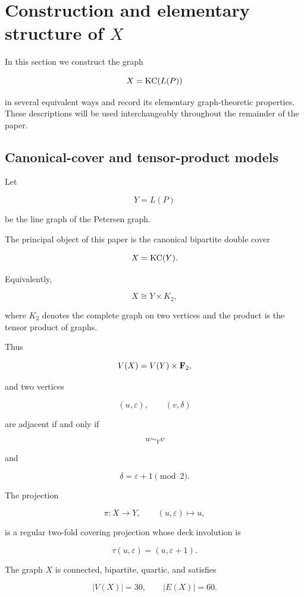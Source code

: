 \section{Construction and elementary structure of \(X\)}

In this section we construct the graph

\[
X=\operatorname{KC}(L(P))
\]

in several equivalent ways and record its elementary graph-theoretic
properties. These descriptions will be used interchangeably throughout the
remainder of the paper.

\subsection{Canonical-cover and tensor-product models}

Let

\[
Y=L(P)
\]

be the line graph of the Petersen graph.

The principal object of this paper is the canonical bipartite double cover

\[
X=\operatorname{KC}(Y).
\]

Equivalently,

\[
X\cong Y\times K_2,
\]

where \(K_2\) denotes the complete graph on two vertices and the product is
the tensor product of graphs.

Thus

\[
V(X)
=
V(Y)\times\mathbf F_2,
\]

and two vertices

\[
(u,\varepsilon),
\qquad
(v,\delta)
\]

are adjacent if and only if

\[
u\sim_Y v
\]

and

\[
\delta
=
\varepsilon+1
\pmod2.
\]

The projection

\[
\pi:
X
\longrightarrow
Y,
\qquad
(u,\varepsilon)
\longmapsto
u,
\]

is a regular two-fold covering projection whose deck involution is

\[
\tau(u,\varepsilon)
=
(u,\varepsilon+1).
\]

\begin{proposition}

The graph \(X\) is connected, bipartite, quartic, and satisfies

\[
|V(X)|=30,
\qquad
|E(X)|=60.
\]

\end{proposition}

